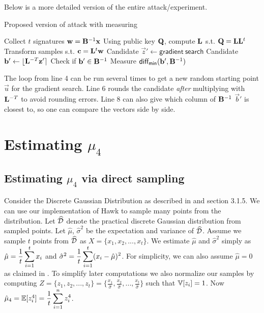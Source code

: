 Below is a more detailed version of the entire attack/experiment.
\begin{algorithm}[H]
\caption{Proposed version of attack with measuring}
\begin{algorithmic}[1]
    \State Collect $t$ signatures $\mathbf{w} = \mathbf{B}^{-1} \mathbf{x}$ 
    \State Using public key $\mathbf{Q}$, compute $\mathbf{L}$ s.t. $\mathbf{Q} = \mathbf{L} \mathbf{L}^t$
    \State Transform samples s.t. $\mathbf{c} = \mathbf{L}^t \mathbf{w}$
    \Loop
    \State Candidate $\vec{z}' \gets \mathsf{gradient \ search}$ 
    \State Candidate $\mathbf{b}' \gets \lfloor \mathbf{L}^{-T} \mathbf{z}' \rceil$ 
    \State Check if $\mathbf{b}' \in \mathbf{B}^{-1}$
    \State Measure $\mathsf{diff_{min}}(\mathbf{b}', \mathbf{B}^{-1})$
    \EndLoop
\end{algorithmic}
\end{algorithm}

The loop from line 4 can be run several times to get a new random starting point $\vec{u}$ for the gradient search.
Line 6 rounds the candidate \textit{after} multiplying with $\mathbf{L}^{-T}$ to avoid rounding errors.
Line 8 can also give which column of $\mathbf{B}^{-1}$ $\vec{b}'$ is closest to, so one can compare the vectors side by side.


\section{Estimating $\mu_4$}
\subsection{Estimating $\mu_4$ via direct sampling}
Consider the Discrete Gaussian Distribution as described in \cite{HawkSpec24} and section 3.1.5. We can use our implementation of Hawk to sample many points from the distribution.
Let $\widehat{\mathcal{D}}$ denote the practical discrete Gaussian distribution from sampled points.
Let $\hat{\mu}$, $\hat{\sigma}^2$ be the expectation and variance of $\widehat{\mathcal{D}}$.
Assume we sample $t$ points from $\widehat{\mathcal{D}}$ as $X = \{x_1, x_2, ..., x_t\}$. We estimate $\hat{\mu}$ and $\hat{\sigma}^2$ simply as $\hat{\mu} = \mathlarger{\frac{1}{t} \sum_{i=1}^{t} x_i}$ and $\hat{\sigma}^2 = \mathlarger{\frac{1}{t} \sum_{i=1}^{t}(x_i - \hat{\mu})^2}$.
For simplicity, we can also assume $\hat{\mu} = 0$ as claimed in \cite{HawkSpec24}.
To simplify later computations we also normalize our samples by computing $Z = \{z_1, z_2, ..., z_t\} = \{\frac{x_1}{\hat{\sigma}}, \frac{x_2}{\hat{\sigma}},..., \frac{x_t}{\hat{\sigma}}\}$ such that 
$\mathbb{V}[z_i] = 1$.
Now $\hat{\mu}_4 = \bb{E}[z_i^4] = \mathlarger{\frac{1}{t} \sum_{i=1}^{n} z_i ^4}$. 

